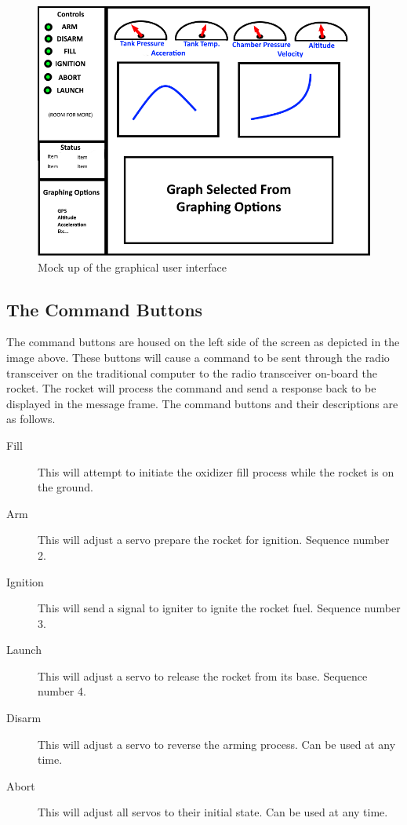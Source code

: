 \documentclass[10pt,draftclsnofoot,onecolumn,retainorgcmds]{IEEEtran}
\begin{document}
\begin{figure}[!ht]
	\caption{Mock up of the graphical user interface}
	\centering
	\includegraphics[scale=.85]{HyRoUIMockup}
\end{figure}

\subsection{The Command Buttons}
The command buttons are housed on the left side of the screen as depicted in the image above. These buttons will cause a command to be sent through the radio transceiver on the traditional computer to the radio transceiver on-board the rocket. The rocket will process the command and send a response back to be displayed in the message frame. The command buttons and their descriptions are as follows.\par

\begin{description}
	\item[Fill] This will attempt to initiate the oxidizer fill process while the rocket is on the ground.
	\item[Arm] This will adjust a servo prepare the rocket for ignition. Sequence number 2.
	\item[Ignition] This will send a signal to igniter to ignite the rocket fuel. Sequence number 3.
	\item[Launch] This will adjust a servo to release the rocket from its base. Sequence number 4.
	\item[Disarm] This will adjust a servo to reverse the arming process. Can be used at any time.
	\item[Abort] This will adjust all servos to their initial state. Can be used at any time.
\end{description}
\end{document}
